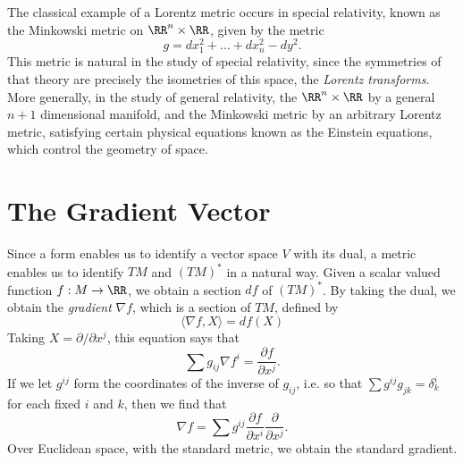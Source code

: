 \begin{example}
    The classical example of a Lorentz metric occurs in special relativity, known as the Minkowski metric on $\RR^n \times \RR$, given by the metric
    \[ g = dx_1^2 + \dots + dx_n^2 - dy^2. \]
    This metric is natural in the study of special relativity, since the symmetries of that theory are precisely the isometries of this space, the \emph{Lorentz transforms}. More generally, in the study of general relativity, the $\RR^n \times \RR$ by a general $n+1$ dimensional manifold, and the Minkowski metric by an arbitrary Lorentz metric, satisfying certain physical equations known as the Einstein equations, which control the geometry of space.
\end{example}

\section{The Gradient Vector}

Since a form enables us to identify a vector space $V$ with its dual, a metric enables us to identify $TM$ and $(TM)^*$ in a natural way. Given a scalar valued function $f: M \to \RR$, we obtain a section $df$ of $(TM)^*$. By taking the dual, we obtain the \emph{gradient} $\nabla f$, which is a section of $TM$, defined by
%
\[ \langle \nabla f, X \rangle = df(X) \]
%
Taking $X = \partial / \partial x^j$, this equation says that
%
\[ \sum g_{ij} \nabla f^i = \frac{\partial f}{\partial x^j}. \]
%
If we let $g^{ij}$ form the coordinates of the inverse of $g_{ij}$, i.e. so that $\sum g^{ij} g_{jk} = \delta^i_k$ for each fixed $i$ and $k$, then we find that
%
\[ \nabla f = \sum g^{ij} \frac{\partial f}{\partial x^i} \frac{\partial}{\partial x^j}. \]
%
Over Euclidean space, with the standard metric, we obtain the standard gradient.

